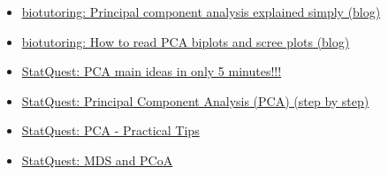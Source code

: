 \documentclass[12pt, titlepage, french]{report}
\begin{document}
\begin{YTB_vids}
\begin{itemize}
	\item	\href{https://blog.bioturing.com/2018/06/14/principal-component-analysis-explained-simply/}{biotutoring: Principal component analysis explained simply (blog)}
	\item	\href{https://blog.bioturing.com/2018/06/18/how-to-read-pca-biplots-and-scree-plots/}{biotutoring: How to read PCA biplots and scree plots (blog)}
	\item	\href{https://www.youtube.com/watch?v=HMOI_lkzW08&list=PLblh5JKOoLUICTaGLRoHQDuF_7q2GfuJF&index=23}{StatQuest: PCA main ideas in only 5 minutes!!!}
	\item	\href{https://www.youtube.com/watch?v=FgakZw6K1QQ}{StatQuest: Principal Component Analysis (PCA) (step by step)}
	\item	\href{https://www.youtube.com/watch?v=oRvgq966yZg&list=PLblh5JKOoLUICTaGLRoHQDuF_7q2GfuJF&index=24}{StatQuest: PCA - Practical Tips}
	\item	\hyperref[MDS-PCOA]{StatQuest: MDS and PCoA}
\end{itemize}
\end{YTB_vids}
\end{document}
